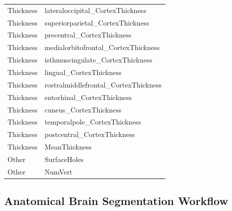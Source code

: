 \documentclass[pdflatex,sn-nature]{sn-jnl}%
\theoremstyle{thmstyleone}%
\theoremstyle{thmstyletwo}%
\theoremstyle{thmstylethree}%
\begin{document}
\begin{appendices}
\begin{small}
\begin{longtable}{l|l}
Thickness & lateraloccipital\_CortexThickness \\
Thickness & superiorparietal\_CortexThickness \\
Thickness & precentral\_CortexThickness \\
Thickness & medialorbitofrontal\_CortexThickness \\
Thickness & isthmuscingulate\_CortexThickness \\
Thickness & lingual\_CortexThickness \\
Thickness & rostralmiddlefrontal\_CortexThickness \\
Thickness & entorhinal\_CortexThickness \\
Thickness & cuneus\_CortexThickness \\
Thickness & temporalpole\_CortexThickness \\
Thickness & postcentral\_CortexThickness \\
Thickness & MeanThickness \\
\midrule
Other & SurfaceHoles \\
Other & NumVert \\

\end{longtable}
\end{small}

\subsection{Anatomical Brain Segmentation Workflow}
\label{sec:anatomical_segmentation_workflow}


\end{appendices}
\end{document}

